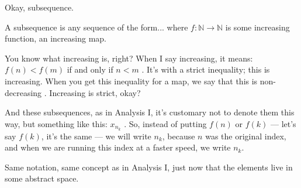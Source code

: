 \begin{speech}[00:20:15 - 00:22:38]
 Okay, subsequence.

A subsequence is any sequence of the form...  where $f \colon \mathbb{N} \to \mathbb{N}$ is some increasing function, an increasing map.

You know what increasing is, right? When I say increasing, it means: $f(n) < f(m)$ if and only if $n < m$ . It's with a strict inequality; this is increasing. When you get this inequality  for a map, we say that this is non-decreasing . Increasing is strict, okay?

And these subsequences, as in Analysis I, it's customary not to denote them this way, but something like this: $x_{n_k}$ . So, instead of putting $f(n)$ or $f(k)$ --- let's say $f(k)$, it's the same --- we will write $n_k$, because $n$ was the original index, and when we are running this index at a faster speed, we write $n_k$.

Same notation, same concept as in Analysis I, just now that the elements live in some abstract space. 
\end{speech}

